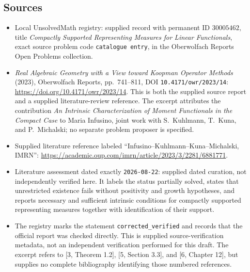 \documentclass[11pt]{article}
\begin{document}
\subsection{Sources}
\begin{itemize}
\item Local UnsolvedMath registry: supplied record with permanent ID \(30005462\), title \emph{Compactly Supported Representing Measures for Linear Functionals}, exact source problem code \texttt{catalogue entry}, in the Oberwolfach Reports Open Problems collection.
\item \emph{Real Algebraic Geometry with a View toward Koopman Operator Methods} (2023), Oberwolfach Reports, pp.\ 741--811, DOI \texttt{10.4171/owr/2023/14}: \url{https://doi.org/10.4171/owr/2023/14}. This is both the supplied source report and a supplied literature-review reference. The excerpt attributes the contribution \emph{An Intrinsic Characterization of Moment Functionals in the Compact Case} to Maria Infusino, joint work with S.\ Kuhlmann, T.\ Kuna, and P.\ Michalski; no separate problem proposer is specified.
\item Supplied literature reference labeled ``Infusino--Kuhlmann--Kuna--Michalski, IMRN'': \url{https://academic.oup.com/imrn/article/2023/3/2281/6881771}.
\item Literature assessment dated exactly \texttt{2026-08-22}: supplied dated curation, not independently verified here. It labels the status partially solved, states that unrestricted existence fails without positivity and growth hypotheses, and reports necessary and sufficient intrinsic conditions for compactly supported representing measures together with identification of their support.
\item The registry marks the statement \texttt{corrected\_verified} and records that the official report was checked directly. This is supplied source-verification metadata, not an independent verification performed for this draft. The excerpt refers to [3, Theorem 1.2], [5, Section 3.3], and [6, Chapter 12], but supplies no complete bibliography identifying those numbered references.
\end{itemize}
\end{document}
